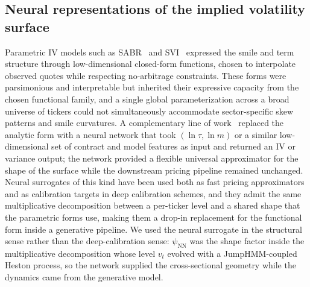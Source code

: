 \subsection{Neural representations of the implied volatility surface}

Parametric IV models such as SABR~\cite{hagan2002} and SVI~\cite{gatheral2004} expressed the smile and term structure through low-dimensional closed-form functions, chosen to interpolate observed quotes while respecting no-arbitrage constraints. These forms were parsimonious and interpretable but inherited their expressive capacity from the chosen functional family, and a single global parameterization across a broad universe of tickers could not simultaneously accommodate sector-specific skew patterns and smile curvatures. A complementary line of work~\cite{horvath2021,bayer2019} replaced the analytic form with a neural network that took $(\ln\tau,\ln m)$ or a similar low-dimensional set of contract and model features as input and returned an IV or variance output; the network provided a flexible universal approximator for the shape of the surface while the downstream pricing pipeline remained unchanged. Neural surrogates of this kind have been used both as fast pricing approximators and as calibration targets in deep calibration schemes, and they admit the same multiplicative decomposition between a per-ticker level and a shared shape that the parametric forms use, making them a drop-in replacement for the functional form inside a generative pipeline. We used the neural surrogate in the structural sense rather than the deep-calibration sense: $\psi_{\mathrm{NN}}$ was the shape factor inside the multiplicative decomposition whose level $v_t$ evolved with a JumpHMM-coupled Heston process, so the network supplied the cross-sectional geometry while the dynamics came from the generative model.

